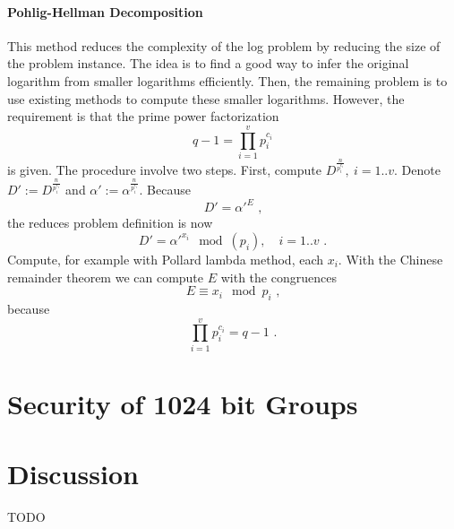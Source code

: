 \documentclass[paper=a4, fontsize=11pt]{scrartcl} %
\numberwithin{equation}{section} %
\numberwithin{figure}{section} %
\numberwithin{table}{section} %
\begin{document}
\paragraph{Pohlig-Hellman Decomposition} This method reduces the complexity of the log problem by reducing the size of the problem instance. The idea is to find a good way to infer the original logarithm from smaller logarithms efficiently. Then, the remaining problem is to use existing methods to compute these smaller logarithms. However, the requirement is that the prime power factorization
\begin{equation}
q-1 = \prod_{i=1}^v p_i^{c_i}
\end{equation}
is given. The procedure involve two steps. First, compute $D^{\frac{n}{p_i^{c_i}}},\ i=1..v$. Denote $D':= D^{\frac{n}{p_i^{c_i}}}$ and $\alpha' := \alpha^{\frac{n}{p_i^{c_i}}}$. Because
\begin{equation}
D' = \alpha'^E
\text{ ,}
\end{equation}
the reduces problem definition is now
\begin{equation}
D' = \alpha'^{x_i} \mod (p_i),\quad i=1..v
\text{ .}
\end{equation}
Compute, for example with Pollard lambda method, each $x_i$. With the Chinese remainder theorem we can compute $E$ with the congruences
\begin{equation}
E \equiv x_i \mod p_i
\text{ ,}
\end{equation}
because
\begin{equation}
\prod_{i=1}^v p_i^{c_i} = q-1
\text{ .}
\end{equation}

\section{Security of 1024 bit Groups}

\section{Discussion}
TODO

\newpage


\end{document}

